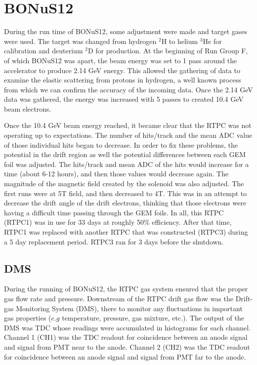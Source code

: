 \cleardoublepage
\section{BONuS12}
During the run time of BONuS12, some adjustment were made and target gases were used. The target was changed from hydrogen $^2$H to helium $^3$He for calibration and deuterium $^2$D for production. At the beginning of Run Group F, of which BONuS12 was apart, the beam energy was set to 1 pass around the accelerator to produce 2.14 GeV energy. This allowed the gathering of data to examine the elastic scattering from protons in hydrogen, a well known process from which we can confirm the accuracy of the incoming data.  Once the 2.14 GeV data was gathered, the energy was increased with 5 passes to created 10.4 GeV beam electrons.

Once the 10.4 GeV beam energy reached, it became clear that the RTPC was not operating up to expectations. The number of hits/track and the mean ADC value of those individual hits began to decrease. In order to fix these problems, the potential in the drift region as well the potential differences between each GEM foil was adjusted. The hits/track and mean ADC of the hits would increase for a time (about 6-12 hours), and then those values would decrease again. The magnitude of the magnetic field created by the solenoid was also adjusted. The first runs were at 5T field, and then decreased to 4T. This was in an attempt to decrease the drift angle of the drift electrons, thinking that those electrons were having a difficult time passing through the GEM foils. In all, this RTPC (RTPC1) was in use for 33 days at roughly 50\% efficiency. After that time, RTPC1 was replaced with another RTPC that was constructed (RTPC3) during a 5 day replacement period. RTPC3 ran for 3 days before the shutdown.

\subsection{DMS}
During the running of BONuS12, the RTPC gas system ensured that the proper gas flow rate and pressure. Downstream of the RTPC drift gas flow was the Drift-gas Monitoring System (DMS), there to monitor any fluctuations in important gas properties ($e.g$ temperature, pressure, gas mixture, etc.). The output of the DMS was TDC whose readings were accumulated in histograms for each channel. Channel 1 (CH1) was the TDC readout for coincidence between an anode signal and signal from PMT near to the anode. Channel 2 (CH2) was the TDC readout for coincidence between an anode signal and signal from PMT far to the anode.


